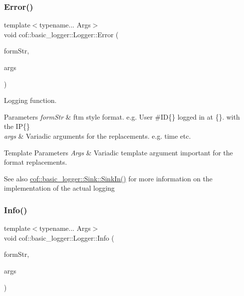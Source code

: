 \subsubsection{\texorpdfstring{Error()}{Error()}}
{\footnotesize\ttfamily template$<$typename... Args$>$ \\
void cof\+::basic\+\_\+logger\+::\+Logger\+::\+Error (\begin{DoxyParamCaption}\item[{const char $\ast$}]{form\+Str,  }\item[{const Args \&...}]{args }\end{DoxyParamCaption})\hspace{0.3cm}{\ttfamily [inline]}}



Logging function. 


\begin{DoxyParams}{Parameters}
{\em form\+Str} & ftm style format. e.\+g. {\ttfamily User \#\+ID\{\} logged in at \{\}. with the IP\{\}} \\
\hline
{\em args} & Variadic arguments for the replacements. e.\+g. time etc. \\
\hline
\end{DoxyParams}

\begin{DoxyTemplParams}{Template Parameters}
{\em Args} & Variadic template argument important for the format replacements. \\
\hline
\end{DoxyTemplParams}
\begin{DoxySeeAlso}{See also}
\hyperlink{classcof_1_1basic__logger_1_1_sink_a085f8c690add00cf55ef0754c5900397}{cof\+::basic\+\_\+logger\+::\+Sink\+::\+Sink\+In()} for more information on the implementation of the actual logging 
\end{DoxySeeAlso}
\mbox{\label{classcof_1_1basic__logger_1_1_logger_a9a280522d90572bed5d06f7540d42522}} 
\subsubsection{\texorpdfstring{Info()}{Info()}}
{\footnotesize\ttfamily template$<$typename... Args$>$ \\
void cof\+::basic\+\_\+logger\+::\+Logger\+::\+Info (\begin{DoxyParamCaption}\item[{const char $\ast$}]{form\+Str,  }\item[{const Args \&...}]{args }\end{DoxyParamCaption})\hspace{0.3cm}{\ttfamily [inline]}}



